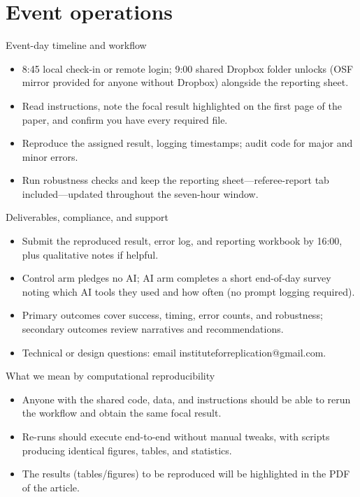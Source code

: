 \documentclass[aspectratio=169,professionalfonts]{beamer}
\begin{document}
\section{Event operations}

\begin{frame}{Event-day timeline and workflow}
  \begin{itemize}
    \item 8:45 local check-in or remote login; 9:00 shared Dropbox folder unlocks (OSF mirror provided for anyone without Dropbox) alongside the reporting sheet.
    \item Read instructions, note the focal result highlighted on the first page of the paper, and confirm you have every required file.
    \item Reproduce the assigned result, logging timestamps; audit code for major and minor errors.
    \item Run robustness checks and keep the reporting sheet—referee-report tab included—updated throughout the seven-hour window.
  \end{itemize}
\end{frame}

\begin{frame}{Deliverables, compliance, and support}
  \begin{itemize}
    \item Submit the reproduced result, error log, and reporting workbook by 16:00, plus qualitative notes if helpful.
    \item Control arm pledges no AI; AI arm completes a short end-of-day survey noting which AI tools they used and how often (no prompt logging required).
    \item Primary outcomes cover success, timing, error counts, and robustness; secondary outcomes review narratives and recommendations.
    \item Technical or design questions: email instituteforreplication@gmail.com.
  \end{itemize}
\end{frame}

\begin{frame}{What we mean by computational reproducibility}
  \begin{itemize}
    \item Anyone with the shared code, data, and instructions should be able to rerun the workflow and obtain the same focal result.
    \item Re-runs should execute end-to-end without manual tweaks, with scripts producing identical figures, tables, and statistics.
    \item The results (tables/figures) to be reproduced will be highlighted in the PDF of the article.
  \end{itemize}
\end{frame}
\end{document}
